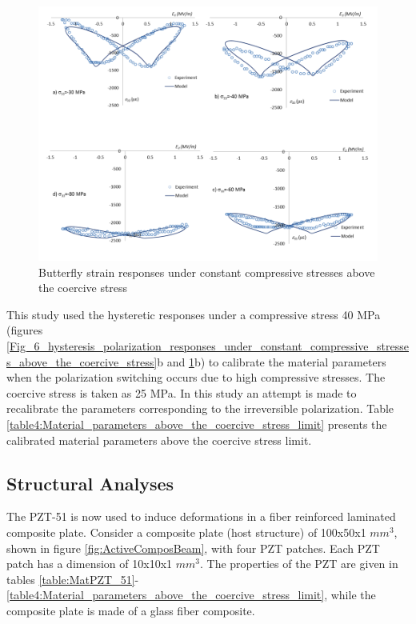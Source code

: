 \begin{figure} 
\centering 
\includegraphics[width=6.0in]{./chap_2_pol_sw/figures/fig_7_butterfly_strain_responses_under_constant_compressive_stresses_above_the_coercive_stress.png} 
\caption{Butterfly strain responses under constant compressive stresses above the coercive stress}
\label{fig_7_butterfly_strain_responses_under_constant_compressive_stresses_above_the_coercive_stress}
\end{figure}
This study used the hysteretic responses under a compressive stress 40 MPa (figures \ref{Fig_6_hysteresis_polarization_responses_under_constant_compressive_stresses_above_the_coercive_stress}b and \ref{fig_7_butterfly_strain_responses_under_constant_compressive_stresses_above_the_coercive_stress}b) to calibrate the material parameters when the polarization switching occurs due to high compressive stresses.  
The coercive stress is taken as 25 MPa. 
In this study an attempt is made to recalibrate the parameters corresponding to the irreversible polarization. 
Table \ref{table4:Material_parameters_above_the_coercive_stress_limit} presents the calibrated material parameters above the coercive stress limit. 
\newpage

\subsection{Structural Analyses}
The PZT-51 is now used to induce deformations in a fiber reinforced laminated composite plate. 
Consider a composite plate (host structure) of 100x50x1 $mm^3$, shown in figure \ref{fig:ActiveComposBeam}, with four PZT patches. 
Each PZT patch has a dimension of 10x10x1 $mm^3$. 
The properties of the PZT are given in tables \ref{table:MatPZT_51}-\ref{table4:Material_parameters_above_the_coercive_stress_limit}, while the composite plate is made of a glass fiber composite. 

